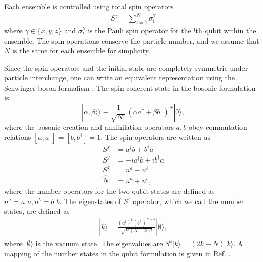 \documentclass[%
  prx,%
  twocolumn,%
  preprintnumbers,%
  amsmath,%
  amssymb,%
  superscriptaddress%
]{revtex4}
\begin{document}
Each ensemble is controlled using total spin operators
%
\begin{align}
S^\gamma = \sum_{l=1}^N \sigma_l^\gamma
\end{align}
%
where $\gamma \in\{ x, y, z \} $ and $ \sigma_l^\gamma $ is the Pauli spin operator for the $ l $th qubit within the ensemble.  The spin operations conserve the particle number, and we assume that $ N $ is the same for each ensemble for simplicity. 

Since the spin operators and the initial state are completely symmetric under particle interchange, one can write an equivalent representation using the Schwinger boson formalism \cite{byrnes2020quantum}.  The spin coherent state in the bosonic formulation is 
%
\begin{equation}
\label{becqubit}
|\alpha,\beta\rangle\rangle\equiv\frac{1}{\sqrt{N!}}(\alpha a^\dagger+\beta b^\dagger)^{N}|0\rangle,
\end{equation}
%
where the bosonic creation and annihilation operators $ a, b $ obey commutation relations $[a,a^\dagger]=[b,b^\dagger]=1$. The spin operators are written as
%
\begin{align}
S^x & = a^\dagger b + b^\dagger a \nonumber \\
S^y & = -i a^\dagger b + i b^\dagger a \nonumber \\
S^z & = n^a - n^b \nonumber \\
\hat{N} & = n^a + n^b , 
\end{align}
%
where the number operators for the two qubit states are defined as $ n^a = a^\dagger a, n^b = b^\dagger b $.  The eigenstates of $ S^z $ operator, which we call the number states, are defined as
%
\begin{align}
| k \rangle = \frac{ (a^\dagger)^k (b^\dagger)^{N-k} }{\sqrt{k! (N-k)!}} | \emptyset \rangle ,
\end{align}
%
where $ | \emptyset \rangle $ is the vacuum state.  The eigenvalues are $ S^z |k \rangle = (2k - N) | k \rangle $. A mapping of the number states in the qubit formulation is given in Ref. \cite{byrnes2023multipartite}.  


\end{document}
